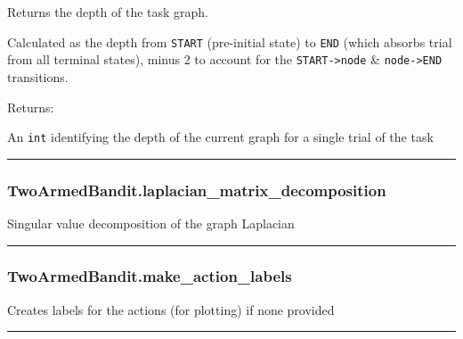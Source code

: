 Returns the depth of the task graph.

Calculated as the depth from \texttt{START} (pre-initial state) to
\texttt{END} (which absorbs trial from all terminal states), minus 2 to
account for the \texttt{START-\textgreater{}node} \&
\texttt{node-\textgreater{}END} transitions.

Returns:

An \texttt{int} identifying the depth of the current graph for a single
trial of the task

\begin{center}\rule{0.5\linewidth}{\linethickness}\end{center}

\subsubsection{TwoArmedBandit.laplacian\_matrix\_decomposition}\label{twoarmedbandit.laplacian_matrix_decomposition}

\begin{Shaded}
\begin{Highlighting}[]
\NormalTok{)}
\end{Highlighting}
\end{Shaded}

Singular value decomposition of the graph Laplacian

\begin{center}\rule{0.5\linewidth}{\linethickness}\end{center}

\subsubsection{TwoArmedBandit.make\_action\_labels}\label{twoarmedbandit.make_action_labels}

\begin{Shaded}
\begin{Highlighting}[]
\NormalTok{)}
\end{Highlighting}
\end{Shaded}

Creates labels for the actions (for plotting) if none provided

\begin{center}\rule{0.5\linewidth}{\linethickness}\end{center}

